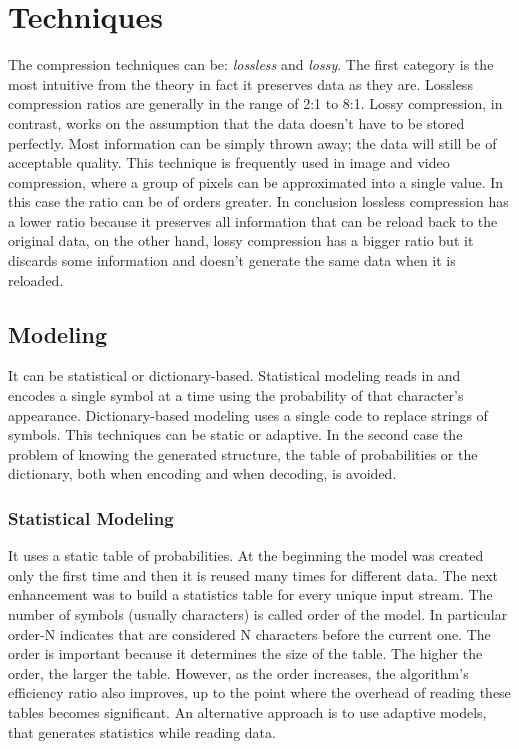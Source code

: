 \documentclass[12pt, a4paper]{report}
\begin{document}
\section{Techniques}

The compression techniques can be: \textit{lossless} and \textit{lossy}.
The first category is the most intuitive from the theory in fact it preserves data as they are.
Lossless compression ratios are generally in the range of 2:1 to 8:1.
Lossy compression, in contrast, works on the assumption that the data doesn't have to be stored perfectly.
Most information can be simply thrown away; the data will still be of acceptable quality.
This technique is frequently used in image and video compression, where a group of pixels can be approximated into a single value.
In this case the ratio can be of orders greater.
In conclusion lossless compression has a lower ratio because it preserves all information that can be reload back to the original
data, on the other hand, lossy compression has a bigger ratio but it discards some information and doesn't generate the same data
when it is reloaded.

\subsection{Modeling}

It can be statistical or dictionary-based.
Statistical modeling reads in and encodes a single symbol at a time using the probability of that character's appearance.
Dictionary-based modeling uses a single code to replace strings of symbols.
This techniques can be static or adaptive.
In the second case the problem of knowing the generated structure, the table of probabilities or the dictionary,
both when encoding and when decoding, is avoided.

\subsubsection{Statistical Modeling}

It uses a static table of probabilities.
At the beginning the model was created only the first time and then it is reused many times for different data.
The next enhancement was to build a statistics table for every unique input stream.
The number of symbols (usually characters) is called order of the model.
In particular order-N indicates that are considered N characters before the current one.
The order is important because it determines the size of the table.
The higher the order, the larger the table.
However, as the order increases, the algorithm's efficiency ratio also improves, up to the point where the overhead of
reading these tables becomes significant.
An alternative approach is to use adaptive models, that generates statistics while reading data.
\end{document}
